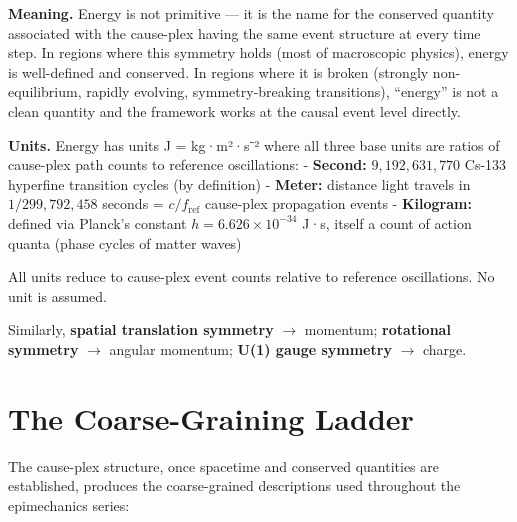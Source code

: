 \documentclass[11pt]{article}
\theoremstyle{definition}
\theoremstyle{remark}
\begin{document}
\textbf{Meaning.} Energy is not primitive --- it is the name for the
conserved quantity associated with the cause-plex having the same event
structure at every time step. In regions where this symmetry holds (most
of macroscopic physics), energy is well-defined and conserved. In
regions where it is broken (strongly non-equilibrium, rapidly evolving,
symmetry-breaking transitions), ``energy'' is not a clean quantity and
the framework works at the causal event level directly.

\textbf{Units.} Energy has units J = kg·m²·s⁻² where all three base
units are ratios of cause-plex path counts to reference oscillations: -
\textbf{Second:} \(9{,}192{,}631{,}770\) Cs-133 hyperfine transition
cycles (by definition) - \textbf{Meter:} distance light travels in
\(1/299{,}792{,}458\) seconds = \(c / f_{\text{ref}}\) cause-plex
propagation events - \textbf{Kilogram:} defined via Planck's constant
\(h = 6.626 \times 10^{-34}\) J·s, itself a count of action quanta
(phase cycles of matter waves)

All units reduce to cause-plex event counts relative to reference
oscillations. No unit is assumed.

Similarly, \textbf{spatial translation symmetry} \(\to\) momentum;
\textbf{rotational symmetry} \(\to\) angular momentum; \textbf{U(1)
gauge symmetry} \(\to\) charge.

\medskip

\section{The Coarse-Graining Ladder}\label{the-coarse-graining-ladder}

The cause-plex structure, once spacetime and conserved quantities are
established, produces the coarse-grained descriptions used throughout
the epimechanics series:
\end{document}
